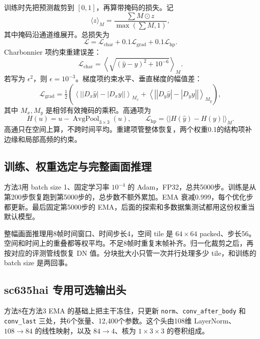 \documentclass[11pt,a4paper,UTF8,fontset=fandol]{ctexart}
\begin{document}
训练时先把预测裁剪到 $[0,1]$，再算带掩码的损失。记
\begin{equation}
 \langle z\rangle_M=\frac{\sum M\odot z}{\max(\sum M,1)},
\end{equation}
其中掩码沿通道维展开。总损失为
\begin{equation}
 \mathcal L=\mathcal L_{\mathrm{char}}+0.1\mathcal L_{\mathrm{grad}}+0.1\mathcal L_{\mathrm{hp}}.
 \label{eq:loss}
\end{equation}
Charbonnier 项\cite{r13}约束重建误差：
\begin{equation}
 \mathcal L_{\mathrm{char}}=\left\langle\sqrt{(\hat y-y)^2+10^{-6}}\right\rangle_M.
\end{equation}
若写为 $\epsilon^2$，则 $\epsilon=10^{-3}$。梯度项约束水平、垂直梯度的幅值差：
\begin{equation}
 \mathcal L_{\mathrm{grad}}=\tfrac12\left(
 \left\langle\left||D_x\hat y|-|D_xy|\right|\right\rangle_{M_x}+
 \left\langle\left||D_y\hat y|-|D_yy|\right|\right\rangle_{M_y}\right),
\end{equation}
其中 $M_x,M_y$ 是相邻有效掩码的乘积。高通项为
\begin{equation}
 H(u)=u-\operatorname{AvgPool}_{3\times3}(u),\qquad
 \mathcal L_{\mathrm{hp}}=\langle|H(\hat y)-H(y)|\rangle_M.
\end{equation}
高通只在空间上算，不跨时间平均。重建项管整体恢复，两个权重0.1的结构项补边缘和局部高频的约束。

\subsection{训练、权重选定与完整画面推理}

方法3用 batch size 1、固定学习率 $10^{-4}$ 的 Adam，FP32，总共5000步。训练是从第200步恢复跑到第5000步的，总步数不额外累加。EMA 衰减0.999，每个优化步都更新。最后固定第5000步的 EMA，后面的探索和多数据集测试都用这份权重当默认模型。

整幅画面推理用8帧时间窗口、时间步长4，空间 tile 是 $64\times64$ packed、步长56。空间和时间上的重叠都等权平均。不足8帧时重复末帧补齐。归一化裁剪之后，再按对应的评测管线恢复 DN 值。分块批大小只管一次并行处理多少 tile，和训练的 batch size 是两回事。

\subsection{sc635hai 专用可选输出头}
\label{sec:head}

方法8在方法3 EMA 的基础上把主干冻住，只更新 \texttt{norm}、\texttt{conv\_after\_body} 和 \texttt{conv\_last} 三处，共6个张量、12,400个参数。这个头由108维 LayerNorm、$108\rightarrow84$ 的线性映射，以及 $84\rightarrow4$、核为 $1\times3\times3$ 的卷积组成。
\end{document}
